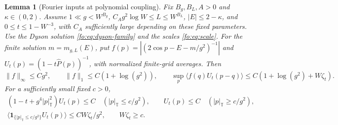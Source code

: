 \documentclass[11pt]{article}
\numberwithin{equation}{section}
\newtheorem{lemma}[theorem]{Lemma}
\theoremstyle{remark}
\begin{document}
\begin{lemma}[Fourier inputs at polynomial coupling]
\label{ll:lem:deterministic}
Fix $B_g,B_L,A>0$ and $\kappa\in(0,2)$. Assume $1\ll g<W^{B_g}$,
$C_Ag^2\log W\le L\le W^{B_L}$, $|E|\le2-\kappa$, and
$0\le t\le1-W^{-3}$, with $C_A$ sufficiently large depending on
these fixed parameters. Use the Dyson solution
\eqref{fo:eq:dyson-family} and the scales \eqref{fo:eq:scale}.
For the finite solution $m=m_{g,L}(E)$, put
$f(p)=|(2\cos p-E-m/g^2)^{-1}|$ and
$U_t(p)=(1-t\widehat P(p))^{-1}$, with normalized finite-grid averages.
Then
\begin{equation}\label{ll:eq:forest-input}
 \|f\|_\infty\le Cg^2,\qquad \|f\|_1\le C(1+\log(g^2)),
 \qquad \sup_p\langle f(q)U_t(p-q)\rangle
       \le C(1+\log(g^2)+W\zeta_t).
\end{equation}
For a sufficiently small fixed $c>0$,
\begin{equation}\label{ll:eq:low-frequency-input}
 \begin{gathered}
 (1-t+g^4|p|_{\mathbb T}^2)U_t(p)\le C
       \quad(|p|_{\mathbb T}\le c/g^2),\qquad
 U_t(p)\le C\quad(|p|_{\mathbb T}\ge c/g^2),\\
 \langle\mathbf1_{\{|p|_{\mathbb T}\le c/g^2\}}U_t(p)\rangle
       \le CW\zeta_t/g^2,\qquad W\zeta_t\ge c.
 \end{gathered}
\end{equation}
\end{lemma}
\end{document}
